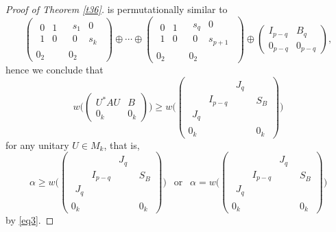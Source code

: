 \documentclass[10pt,a4paper]{amsart}
\begin{document}
\begin{proof}[Proof of Theorem \ref{t36}]
is permutationally similar to
$$\left(\begin{array}{c|c}\begin{array}{cc} 0 & 1\\ 1 & 0\end{array} & \begin{array}{cc} s_1 & 0\\ 0 & s_k\end{array}
\\ \hline 0_2 & 0_2\end{array}\right)\oplus \cdots\oplus
\left(\begin{array}{c|c}\begin{array}{cc} 0 & 1\\ 1 & 0\end{array} & \begin{array}{cc} s_q & 0\\ 0 & s_{p+1}\end{array}
\\ \hline 0_2 & 0_2\end{array}\right) \oplus
\begin{pmatrix} I_{p-q} & B_q\\ 0_{p-q} & 0_{p-q}\end{pmatrix},$$
hence we conclude that
$$w\Big(\begin{pmatrix} U^*AU & B\\ 0_k & 0_k\end{pmatrix}\Big) \ge w\Big(\left(\begin{array}{c|c}\begin{array}{ccc}  & & J_q\\ & I_{p-q} & \\ J_q & & \end{array} & S_B
\\ \hline 0_k & 0_k\end{array}\right)\Big)$$
for any unitary $U\in M_k$, that is,
$$\alpha\ge
w\Big(\left(\begin{array}{c|c}\begin{array}{ccc}  & & J_q\\ & I_{p-q} & \\ J_q & & \end{array} & S_B
\\ \hline 0_k & 0_k\end{array}\right)\Big) \ \ \mbox{ or } \ \
\alpha=
w\Big(\left(\begin{array}{c|c}\begin{array}{ccc}  & & J_q\\ & I_{p-q} & \\ J_q & & \end{array} & S_B
\\ \hline 0_k & 0_k\end{array}\right)\Big)$$
by \eqref{eq3}.



\end{proof}
\end{document}
